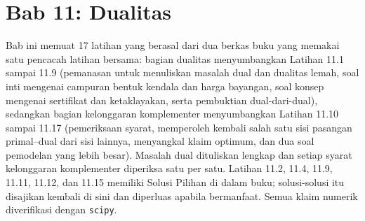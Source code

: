 \section{Bab 11: Dualitas}

Bab ini memuat 17 latihan yang berasal dari dua berkas buku yang memakai satu pencacah latihan bersama: bagian dualitas menyumbangkan Latihan 11.1 sampai 11.9 (pemanasan untuk menuliskan masalah dual dan dualitas lemah, soal inti mengenai campuran bentuk kendala dan harga bayangan, soal konsep mengenai sertifikat dan ketaklayakan, serta pembuktian dual-dari-dual), sedangkan bagian kelonggaran komplementer menyumbangkan Latihan 11.10 sampai 11.17 (pemeriksaan syarat, memperoleh kembali salah satu sisi pasangan primal--dual dari sisi lainnya, menyangkal klaim optimum, dan dua soal pemodelan yang lebih besar). Masalah dual dituliskan lengkap dan setiap syarat kelonggaran komplementer diperiksa satu per satu. Latihan 11.2, 11.4, 11.9, 11.11, 11.12, dan 11.15 memiliki Solusi Pilihan di dalam buku; solusi-solusi itu disajikan kembali di sini dan diperluas apabila bermanfaat. Semua klaim numerik diverifikasi dengan \texttt{scipy}.

